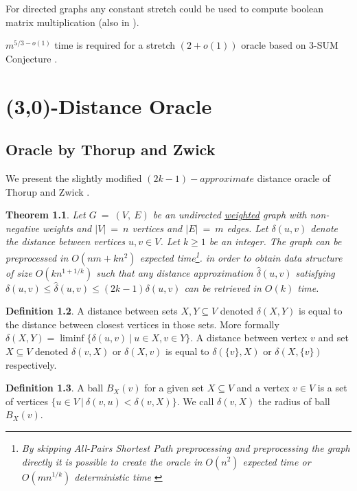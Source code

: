 \documentclass[shortabstract, lic, english]{iithesis}
\theoremstyle{definition} \newtheorem{definition}{Definition}[chapter]
\theoremstyle{plain} \newtheorem{remark}[definition]{Observation}
\theoremstyle{plain} \newtheorem{theorem}[definition]{Theorem}
\theoremstyle{plain} \newtheorem{lemma}[definition]{Lemma}
\theoremstyle{plain} \newtheorem{conjecture}[definition]{Conjecture}
\begin{document}
For directed graphs any constant stretch could be used to compute boolean matrix multiplication (also in \cite{matrixLowerBound}).

$m^{5/3 - o(1)}$ time is required for a stretch $(2 + o(1))$ oracle based on 3-SUM Conjecture \cite{3sumLowerBound}.




\chapter{(3,0)-Distance Oracle} \label{30DistanceOracle}

\section{Oracle by Thorup and Zwick}

We present the slightly modified $(2k-1)-approximate$ distance oracle of Thorup and Zwick \cite{a0OraclesBasic}.

\begin{theorem}
Let $G~=~(V,~E)$ be an undirected \underline{weighted} graph with non-negative weights and $|V|~=~n$ vertices and $|E|~=~m$ edges.
Let $\delta(u,v)$ denote the distance between vertices $u,v \in V$.
Let $k\geq1$ be an integer. The graph can be preprocessed in $O(nm + kn^2)$ expected time\footnote{
    By skipping All-Pairs Shortest Path preprocessing and preprocessing the graph directly it is possible to create the oracle in $O(n^2)$ expected time \cite{a0OraclesN2Time} or $O(mn^{1/k})$ deterministic time \cite{a0OraclesMN1KDeterministicTime}}.
in order to obtain data structure of size $O(kn^{1+1/k})$ such that any distance approximation
$\hat{\delta}(u,v)$ satisfying $\delta(u,v)\leq \hat{\delta}(u,v)\leq (2k-1)\delta(u, v)$
can be retrieved in $O(k)$ time.
\end{theorem}

\begin{definition}
    A distance between sets $X, Y \subseteq V$ denoted $\delta(X,Y)$ is equal to the distance
    between closest vertices in those sets. 
    More formally $\delta(X,Y) = \liminf\{\delta(u,v) ~|~ u\in X, v\in Y\}$.
    A distance between vertex $v$ and set $X \subseteq V$ denoted $\delta(v,X)$ or $\delta(X,v)$
    is equal to $\delta(\{v\},X)$ or $\delta(X,\{v\})$ respectively.
\end{definition}

\begin{definition}
    A ball $B_X(v)$ for a given set $X \subseteq V$ and a vertex $v\in V$
    is a set of vertices $\{u \in V ~|~ \delta(v,u) < \delta(v, X)\}$. We call $\delta(v, X)$ the radius of ball $B_X(v)$.
\end{definition}
\end{document}
